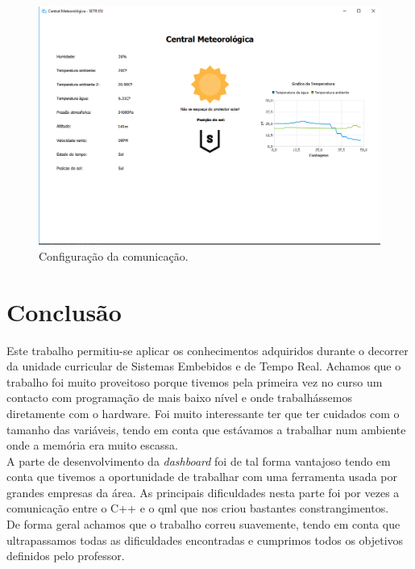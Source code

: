\documentclass[11pt]{report}
\begin{document}
\medskip
\begin{figure} [!h]
\centering
\includegraphics[width=\textwidth]{Prints/qt.png}
\caption{Configuração da comunicação.}
\end{figure}

\clearpage


\chapter*{Conclusão}

Este trabalho permitiu-se aplicar os conhecimentos adquiridos durante o decorrer da unidade curricular de Sistemas Embebidos e de Tempo Real. Achamos que o trabalho foi muito proveitoso porque tivemos pela primeira vez no curso um contacto com programação de mais baixo nível e onde trabalhássemos diretamente com o hardware. Foi muito interessante ter que ter cuidados com o tamanho das variáveis, tendo em conta que estávamos a trabalhar num ambiente onde a memória era muito escassa. \\ 

A parte de desenvolvimento da \textit{dashboard} foi de tal forma vantajoso tendo em conta que tivemos a oportunidade de trabalhar com uma ferramenta usada por grandes empresas da área. As principais dificuldades nesta parte foi por vezes a comunicação entre o C++ e o qml que nos criou bastantes constrangimentos. \\

De forma geral achamos que o trabalho correu suavemente, tendo em conta que ultrapassamos todas as dificuldades encontradas  e cumprimos todos os objetivos definidos pelo professor.
\end{document}
